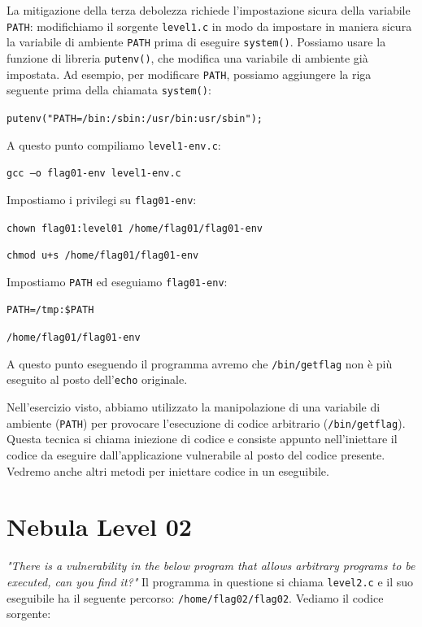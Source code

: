 La mitigazione della terza debolezza richiede l'impostazione sicura della variabile \texttt{PATH}: modifichiamo il sorgente \texttt{level1.c} in modo da impostare in maniera sicura la variabile di ambiente \texttt{PATH} prima di eseguire \texttt{system()}. Possiamo usare la funzione di libreria \texttt{putenv()}, che modifica una variabile di ambiente già impostata. Ad esempio, per modificare \texttt{PATH}, possiamo aggiungere la riga seguente prima della chiamata \texttt{system()}:
\begin{center}
    \texttt{putenv("PATH=/bin:/sbin:/usr/bin:usr/sbin");}
\end{center}
A questo punto compiliamo \texttt{level1-env.c}:
\begin{center}
    \texttt{gcc –o flag01-env level1-env.c}
\end{center}
Impostiamo i privilegi su \texttt{flag01-env}:
\begin{center}
    \texttt{chown flag01:level01 /home/flag01/flag01-env}
    
    \texttt{chmod u+s /home/flag01/flag01-env}
\end{center}
Impostiamo \texttt{PATH} ed eseguiamo \texttt{flag01-env}:
\begin{center}
    \texttt{PATH=/tmp:\$PATH}
    
    \texttt{/home/flag01/flag01-env}
\end{center}
A questo punto eseguendo il programma avremo che \texttt{/bin/getflag} non è più eseguito al posto dell'\texttt{echo} originale.

\vspace{5mm}

Nell'esercizio visto, abbiamo utilizzato la
manipolazione di una variabile di ambiente
(\texttt{PATH}) per provocare l'esecuzione di codice
arbitrario (\texttt{/bin/getflag}). Questa tecnica si chiama iniezione di codice e
consiste appunto nell'iniettare il codice da
eseguire dall'applicazione vulnerabile al posto
del codice presente. Vedremo anche altri metodi per iniettare codice
in un eseguibile.

\section{Nebula Level 02}
\textit{"There is a vulnerability in the below program
that allows arbitrary programs to be executed,
can you find it?"} Il programma in questione si chiama \texttt{level2.c}
e il suo eseguibile ha il seguente percorso:
\texttt{/home/flag02/flag02}. Vediamo il codice sorgente:


